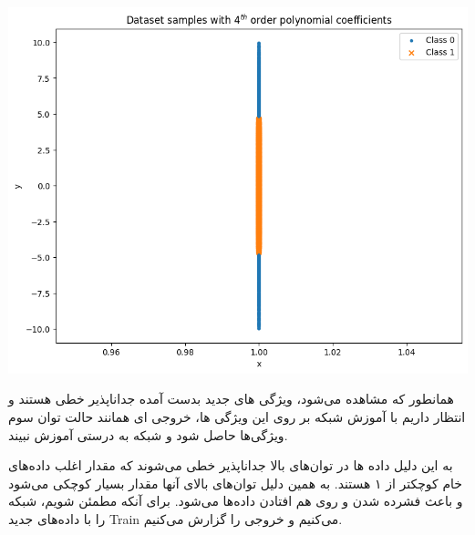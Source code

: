 \begin{enumerate}
\begin{qsolve}
		\begin{center}
			\includegraphics*[width=1\linewidth]{pics/img15.png}
			\label{فضای جدید ویژگی‌ها}
		\end{center}
		
		همانطور که مشاهده می‌شود، ویژگی های جدید بدست آمده جداناپذیر خطی هستند و انتظار داریم با آموزش شبکه بر روی این ویژگی ها، خروجی ای همانند حالت توان سوم ویژگی‌ها حاصل شود و شبکه به درستی آموزش نبیند. 
	\end{qsolve}
	
	
	
	\begin{qsolve}
		به این دلیل داده ها در توان‌های بالا جداناپذیر خطی می‌شوند که مقدار اغلب داده‌های خام کوچکتر از ۱ هستند. به همین دلیل توان‌های بالای آنها مقدار بسیار کوچکی می‌شود و باعث فشرده شدن و روی هم افتادن داده‌ها می‌شود. برای آنکه مطمئن شویم، شبکه را با داده‌های جدید Train می‌کنیم و خروجی را گزارش می‌کنیم.
		
	\end{qsolve}
	
	
	
	
	
	
	
	
	
	
\end{enumerate}







































